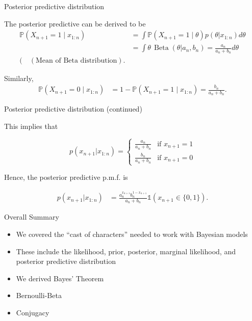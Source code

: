 \documentclass[
  ignorenonframetext,
]{beamer}
\providecommand{\tightlist}{%
  \setlength{\itemsep}{0pt}\setlength{\parskip}{0pt}}
\DeclareMathOperator*{\Beta}{Beta}
\renewcommand{\Pr}{\mathbb{P}}
\newcommand{\I}{\mathds{1}}
\begin{document}
\begin{frame}{Posterior predictive distribution}
\protect\hypertarget{posterior-predictive-distribution-2}{}

The posterior predictive can be derived to be \[
\begin{aligned}
\Pr(X_{n+1} = 1\mid x_{1:n}) & = \int \Pr(X_{n+1} = 1\mid \theta) p(\theta|x_{1:n}) d\theta\\
& =\int \theta\,\Beta(\theta|a_n,b_n) =\frac{a_n}{a_n + b_n} d\theta\\ (\quad (\text{Mean of Beta distribution}).
\end{aligned}
\]

Similarly, \[
\begin{aligned}
\Pr(X_{n+1} = 0 \mid x_{1:n}) & = 1- \Pr(X_{n+1} = 1 \mid x_{1:n}) = \frac{b_n}{a_n + b_n}.
\end{aligned}
\]

\end{frame}

\begin{frame}{Posterior predictive distribution (continued)}
\protect\hypertarget{posterior-predictive-distribution-continued}{}

This implies that

\[p(x_{n+1}|x_{1:n}) =
\begin{cases} 
 \frac{a_n}{a_n + b_n} & \mbox{if } x_{n+1} = 1  \\
\frac{b_n}{a_n + b_n} & \mbox{if } x_{n+1} = 0
\end{cases}
\]

Hence, the posterior predictive p.m.f. is

\[
\begin{aligned}
p(x_{n+1}|x_{1:n}) & = \frac{a_n^{x_{n+1}} b_n^{1-x_{n+1}}}{a_n + b_n}\I(x_{n+1}\in\{0,1\}).
\end{aligned}
\]

\end{frame}

\begin{frame}{Overall Summary}
\protect\hypertarget{overall-summary}{}

\begin{itemize}
\tightlist
\item
  We covered the ``cast of characters'' needed to work with Bayesian
  models
\item
  These include the likelihood, prior, posterior, marginal likelihood,
  and posterior predictive distribution
\item
  We derived Bayes' Theorem
\item
  Bernoulli-Beta
\item
  Conjugacy
\end{itemize}

\end{frame}
\end{document}
